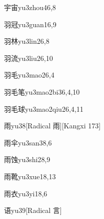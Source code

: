 \begin{entry}{宇宙}{yu3zhou4}{6,8}
\end{entry}

\begin{entry}{羽冠}{yu3guan1}{6,9}
\end{entry}

\begin{entry}{羽林}{yu3lin2}{6,8}
\end{entry}

\begin{entry}{羽流}{yu3liu2}{6,10}
\end{entry}

\begin{entry}{羽毛}{yu3mao2}{6,4}
\end{entry}

\begin{entry}{羽毛笔}{yu3mao2bi3}{6,4,10}
\end{entry}

\begin{entry}{羽毛球}{yu3mao2qiu2}{6,4,11}
\end{entry}

\begin{entry}{雨}{yu3}{8}[Radical 雨][Kangxi 173]
\end{entry}

\begin{entry}{雨伞}{yu3san3}{8,6}
\end{entry}

\begin{entry}{雨蚀}{yu3shi2}{8,9}
\end{entry}

\begin{entry}{雨靴}{yu3xue1}{8,13}
\end{entry}

\begin{entry}{雨衣}{yu3yi1}{8,6}
\end{entry}

\begin{entry}{语}{yu3}{9}[Radical 言]
\end{entry}

